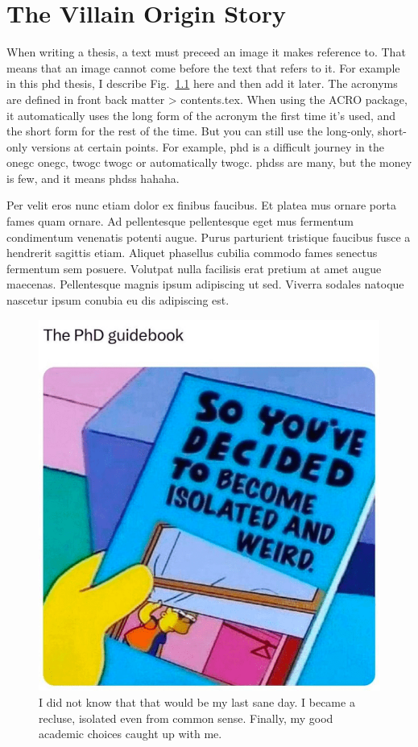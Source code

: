 \chapter{The Villain Origin Story}
When writing a thesis, a text must preceed an image it makes reference to. That means that an image cannot come before the text that refers to it. For example in this \ac{phd} thesis, I describe Fig.~\ref{fig:isolation} here and then add it later. The acronyms are defined in front back matter > contents.tex. When using the ACRO package, it automatically uses the long form of the acronym the first time it's used, and the short form for the rest of the time. But you can still use the long-only, short-only versions at certain points. For example, \acs{phd} is a difficult journey in the \acs{onegc} \ac{onegc}, \acl{twogc} \acs{twogc} or automatically \ac{twogc}. \acsp{phds} are many, but the money is few, and it means \acp{phds} hahaha.

Per velit eros nunc etiam dolor ex finibus faucibus. Et platea mus ornare porta fames quam ornare. Ad pellentesque pellentesque eget mus fermentum condimentum venenatis potenti augue. Purus parturient tristique faucibus fusce a hendrerit sagittis etiam. Aliquet phasellus cubilia commodo fames senectus fermentum sem posuere. Volutpat nulla facilisis erat pretium at amet augue maecenas. Pellentesque magnis ipsum adipiscing ut sed. Viverra sodales natoque nascetur ipsum conubia eu dis adipiscing est.
\begin{figure}[!hbt]
    \centering
    \includegraphics[width=0.5\linewidth]{figures/chapter_1/guidebook-phd.png}
    \caption[I did not know that that would be my last sane day]{I did not know that that would be my last sane day. I became a recluse, isolated even from common sense. Finally, my good academic choices caught up with me.}
    \label{fig:isolation}
\end{figure}

